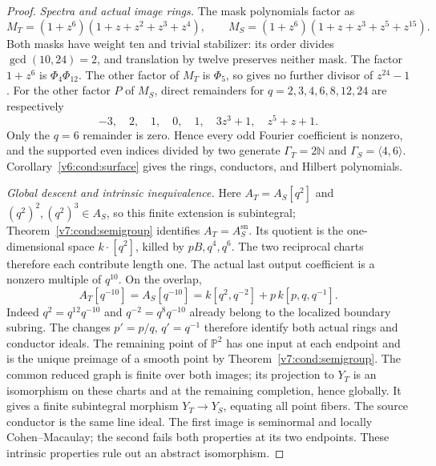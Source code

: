 \documentclass[10pt,fleqn]{article}
\numberwithin{equation}{section}
\newcommand{\PP}{\mathbb P}
\begin{document}
\begin{proof}
\emph{Spectra and actual image rings.}
The mask polynomials factor as
\[
 M_T=(1+z^6)(1+z+z^2+z^3+z^4),\qquad
 M_S=(1+z^6)(1+z+z^3+z^5+z^{15}).
\]
Both masks have weight ten and trivial stabilizer: its order divides
$\gcd(10,24)=2$, and translation by twelve preserves neither mask.
The factor $1+z^6$ is $\Phi_4\Phi_{12}$.
The other factor of $M_T$ is $\Phi_5$, so gives no further divisor of
$z^{24}-1$.  For the other factor $P$ of $M_S$, direct remainders for
$q=2,3,4,6,8,12,24$ are respectively
\[
 -3,\quad2,\quad1,\quad0,\quad1,\quad
 3z^3+1,\quad z^5+z+1.
\]
Only the $q=6$ remainder is zero.  Hence every odd Fourier coefficient
is nonzero, and the supported even indices divided by two generate
$\Gamma_T=2\mathbb N$ and $\Gamma_S=\langle4,6\rangle$.
Corollary~\ref{v6:cond:surface} gives the rings, conductors, and Hilbert
polynomials.

\emph{Global descent and intrinsic inequivalence.}
Here $A_T=A_S[q^2]$ and $(q^2)^2,(q^2)^3\in A_S$, so this finite
extension is subintegral; Theorem~\ref{v7:cond:semigroup} identifies
$A_T=A_S^{\mathrm{sn}}$.  Its quotient is the one-dimensional space $k\cdot[q^2]$,
killed by $pB,q^4,q^6$.
The two reciprocal charts therefore each contribute length one.
The actual last output coefficient is a nonzero multiple of $q^{10}$.
On the overlap,
\[
 A_T[q^{-10}]=A_S[q^{-10}]
   =k[q^2,q^{-2}]+p\,k[p,q,q^{-1}].
\]
Indeed $q^2=q^{12}q^{-10}$ and $q^{-2}=q^8q^{-10}$ already belong
to the localized boundary subring.  The changes $p'=p/q$, $q'=q^{-1}$
therefore identify both actual rings and conductor ideals.
The remaining point of $\PP^2$ has one input at each endpoint and is
the unique preimage of a smooth point by
Theorem~\ref{v7:cond:semigroup}.  The common reduced graph is finite
over both images; its projection to $Y_T$ is an isomorphism on these
charts and at the remaining completion, hence globally.  It gives a
finite subintegral morphism $Y_T\to Y_S$, equating all point fibers.
The source conductor is the same line ideal.  The first image is
seminormal and locally Cohen--Macaulay; the second fails both
properties at its two endpoints.
These intrinsic properties rule out an abstract isomorphism.
\end{proof}
\end{document}
